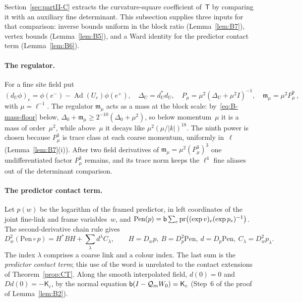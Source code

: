 Section~\ref{sec:partII-C} extracts the curvature-square coefficient of~$\mathsf T$ by comparing it with an auxiliary fine determinant. This subsection supplies three inputs for that comparison: inverse bounds uniform in the block ratio (Lemma~\ref{lem:B7}), vertex bounds (Lemma~\ref{lem:B5}), and a Ward identity for the predictor contact term (Lemma~\ref{lem:B6}).

\paragraph{The regulator.} For a fine site field put
\begin{equation*}
(d_U\phi)_e=\phi(e^-)-\operatorname{Ad}(U_e)\phi(e^+),\quad
\Delta_U=d_U^*d_U,\quad P_\mu=\mu^2(\Delta_U+\mu^2I)^{-1},\quad
\mathfrak m_\mu=\mu^2P_\mu^9\,,
\end{equation*}
with $\mu=\ell^{-1}$. The regulator $\mathfrak m_\mu$ acts as a mass at the block scale: by~\eqref{eq:B-mass-floor} below, $\Delta_0+\mathfrak m_\mu\ge2^{-10}(\Delta_0+\mu^2)$, so below momentum~$\mu$ it is a mass of order~$\mu^2$, while above~$\mu$ it decays like $\mu^2(\mu/|k|)^{18}$. The ninth power is chosen because $P_\mu^3$ is trace class at each coarse momentum, uniformly in~$\ell$ (Lemma~\ref{lem:B7}(i)). After two field derivatives of $\mathfrak m_\mu=\mu^2(P_\mu^3)^3$ one undifferentiated factor $P_\mu^3$ remains, and its trace norm keeps the $\ell^4$ fine aliases out of the determinant comparison.

\paragraph{The predictor contact term.} Let $p(w)$ be the logarithm of the framed predictor, in left coordinates of the joint fine-link and frame variables~$w$, and $\mathrm{Pen}(p)=\mathsf{b}\sum_e\operatorname{pr}\bigl((\exp v)_e(\exp p_e)^{-1}\bigr)$. The second-derivative chain rule gives
\begin{equation}\label{eq:B-contact}
D_w^2(\mathrm{Pen}\circ p)=H^*BH+\sum_\lambda d^\lambda C_\lambda,\qquad
H=D_wp,\ B=D_p^2\mathrm{Pen},\ d=D_p\mathrm{Pen},\ C_\lambda=D^2_wp_\lambda .
\end{equation}
The index $\lambda$ comprises a coarse link and a colour index. The last sum is the \emph{predictor contact term}; this use of the word is unrelated to the contact extensions of Theorem~\ref{prop:CT}. Along the smooth interpolated field, $d(0)=0$ and $Dd(0)=-\mathsf K_c$, by the normal equation $\mathsf{b}(I-\mathcal Q_mW_0)=\mathsf K_c$ (Step~6 of the proof of Lemma~\ref{lem:B2}).

